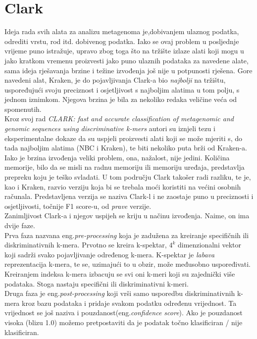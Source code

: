\documentclass[times, utf8, seminar]{fer}
\begin{document}
\section{Clark}
Ideja rada svih alata za analizu metagenoma je,dobivanjem ulaznog podatka, odrediti vrstu, rod itd. dobivenog podatka. Iako se ovaj problem u posljednje vrijeme puno istražuje, upravo zbog toga što na tržište izlaze alati koji mogu u jako kratkom vremenu proizvesti jako puno ulaznih podataka za navedene alate, sama ideja rješavanja brzine i težine izvođenja još nije u potpunosti rješena. Gore navedeni alat, Kraken, je do pojavljivanja Clark-a bio \textit{najbolji} na tržištu, uspoređujući svoju preciznost i osjetljivost s najboljim alatima u tom polju, s jednom iznimkom. Njegova brzina je bila za nekoliko redaka veličine veća od spomenutih.
\\Kroz svoj rad \textit{CLARK: fast and accurate classification of metagenomic and genomic sequences using discriminative k-mers} autori su iznjeli tezu i eksperimentalne dokaze da su uspjeli proizvesti alati koji se može mjeriti s, do tada najboljim alatima (NBC i Kraken), te biti nekoliko puta brži od Kraken-a.
\\Iako je brzina izvođenja veliki problem, ona, nažalost, nije jedini. Količina memorije, bilo da se misli na radnu memoriju ili memoriju uređaja, predstavlja prepreku koju je teško svladati. U tom području Clark takošer radi razliku, te je, kao i Kraken, razvio verziju koja bi se trebala moći koristiti na većini osobnih računala. Predstavljena verzija se naziva Clark-l i ne zaostaje puno u preciznosti i osjetljivosti, točnije F1 score-u, od \textit{prave} verzije.
\\Zanimljivost Clark-a i njegov uspijeh se kriju u načinu izvođenja. Naime, on ima dvije faze. \\Prva faza nazvana eng.\textit{pre-processing} koja je zadužena za kreiranje specifičnih ili diskriminativnih k-mera. Prvotno se kreira k-spektar, ${4}^{k}$ dimenzionalni vektor koji sadrži svako pojavljivanje određenog k-mera. K-spektar je \textit{labava} reprezentacija k-mera, te se, uzimajući to u obzir, može međusobno uspoređivati. Kreiranjem indeksa k-mera izbacuju se svi oni k-meri koji su zajednički više podataka. Stoga nastaju specifični ili diskriminativni k-meri.
\\Druga faza je eng.\textit{post-processing} koji vrši samo usporedbu diskriminativnih k-mera kroz bazu podataka i pridaje svakom podatku određenu vrijednost. Ta vrijednost se još naziva i pouzdanost(eng.\textit{confidence score}). Ako je pouzdanost visoka (blizu 1.0) možemo pretpostaviti da je podatak točno klasificiran / nije klasificiran.
\end{document}
